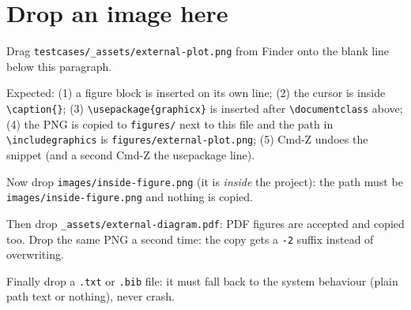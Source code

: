 \documentclass{article}
\begin{document}
\section{Drop an image here}
Drag \texttt{testcases/\_assets/external-plot.png} from Finder onto the blank
line below this paragraph.

Expected: (1) a figure block is inserted on its own line; (2) the cursor is
inside \verb|\caption{}|; (3) \verb|\usepackage{graphicx}| is inserted after
\verb|\documentclass| above; (4) the PNG is copied to \texttt{figures/} next to
this file and the path in \verb|\includegraphics| is \texttt{figures/external-plot.png};
(5) Cmd-Z undoes the snippet (and a second Cmd-Z the usepackage line).

Now drop \texttt{images/inside-figure.png} (it is \emph{inside} the project):
the path must be \texttt{images/inside-figure.png} and nothing is copied.

Then drop \texttt{\_assets/external-diagram.pdf}: PDF figures are accepted and
copied too. Drop the same PNG a second time: the copy gets a \texttt{-2} suffix
instead of overwriting.

Finally drop a \texttt{.txt} or \texttt{.bib} file: it must fall back to the
system behaviour (plain path text or nothing), never crash.
\end{document}
